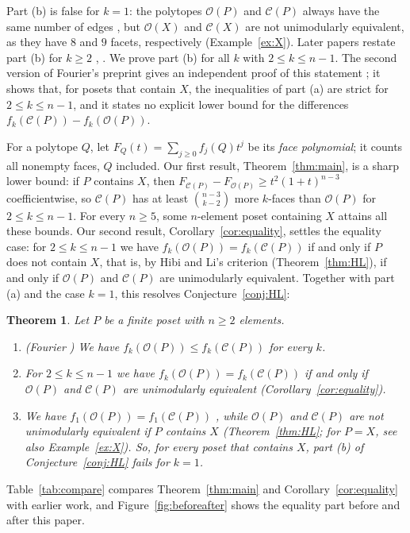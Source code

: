 \documentclass[11pt]{article}
\newtheorem{theorem}{Theorem}[section]
\theoremstyle{definition}
\theoremstyle{remark}
\newcommand{\OO}{\mathcal O}
\newcommand{\CC}{\mathcal C}
\begin{document}
Part (b) is false for $k=1$: the polytopes $\OO(P)$ and $\CC(P)$ always have the same number of edges \cite[Theorem~2.1]{HLSS}, but
$\OO(X)$ and $\CC(X)$ are not unimodularly equivalent, as they have $8$
and $9$ facets, respectively (Example~\ref{ex:X}). Later papers restate part
(b) for $k\geq2$ \cite[Conjecture~1.1]{FLM}, \cite[Conjecture~28]{Lee}.
We prove part (b) for all $k$ with $2\leq k\leq n-1$.
The second version of Fourier's preprint gives an independent proof of this
statement \cite[Theorem~8.2]{FourierV2}; it shows that, for posets that
contain $X$, the inequalities of part (a) are strict for $2\leq k\leq n-1$,
and it states no explicit lower bound for the differences
$f_k(\CC(P))-f_k(\OO(P))$.

For a polytope
$Q$, let $F_Q(t)=\sum_{j\geq0}f_j(Q)t^j$ be its \emph{face polynomial};
it counts all nonempty faces, $Q$ included. Our first result, Theorem~\ref{thm:main}, is a sharp lower bound: if
$P$ contains $X$, then $F_{\CC(P)}-F_{\OO(P)}\geq t^2(1+t)^{n-3}$
coefficientwise, so $\CC(P)$ has at least $\binom{n-3}{k-2}$ more
$k$-faces than $\OO(P)$ for $2\leq k\leq n-1$. For every $n\geq5$, some $n$-element poset containing $X$ attains all these bounds. Our second result,
Corollary~\ref{cor:equality}, settles the equality case: for
$2\leq k\leq n-1$ we have $f_k(\OO(P))=f_k(\CC(P))$ if and only if $P$
does not contain $X$, that is, by Hibi and Li's criterion (Theorem~\ref{thm:HL}), if and only if $\OO(P)$ and $\CC(P)$ are unimodularly equivalent. Together with part (a) and the case $k=1$, this resolves Conjecture~\ref{conj:HL}:

\begin{theorem}\label{thm:resolution}
Let $P$ be a finite poset with $n\geq2$ elements.
\begin{enumerate}
\item[(a)] \textup{(Fourier \cite[Theorem~1.1]{Fourier})} We have $f_k(\OO(P))\leq f_k(\CC(P))$ for every $k$.
\item[(b)] For $2\leq k\leq n-1$ we have $f_k(\OO(P))=f_k(\CC(P))$ if and only if $\OO(P)$ and $\CC(P)$ are
unimodularly equivalent \textup{(Corollary~\ref{cor:equality})}.
\item[(c)] We have $f_1(\OO(P))=f_1(\CC(P))$ \textup{\cite[Theorem~2.1]{HLSS}}, while $\OO(P)$ and $\CC(P)$ are not unimodularly equivalent if $P$ contains $X$ \textup{(Theorem~\ref{thm:HL}; for $P=X$, see also Example~\ref{ex:X})}.
So, for every poset that contains $X$, part (b) of Conjecture~\ref{conj:HL} fails for $k=1$.
\end{enumerate}
\end{theorem}
Table~\ref{tab:compare} compares Theorem~\ref{thm:main} and Corollary~\ref{cor:equality} with earlier work, and Figure~\ref{fig:beforeafter} shows the equality part before and after this paper.
\end{document}
